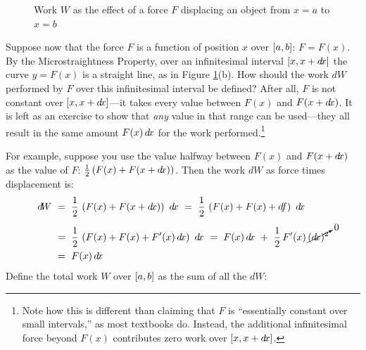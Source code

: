 \begin{figure}[ht]
 \centering
 \qquad\qquad
 \caption[]{\enskip Work $W$ as the effect of a force $F$ displacing an object from $x=a$ to $x=b$}
 \label{fig:work}
\end{figure}

Suppose now that the force $F$ is a function of position $x$ over $\lbrack a,b \rbrack$:
$F=F(x)$. By the Microstraightness Property, over an infinitesimal interval
$\lbrack x,x+d\!x \rbrack$ the curve $y=F(x)$ is a straight line, as in Figure
\ref{fig:work}(b). How should the work $d\!W$ performed by $F$ over this
infinitesimal interval be defined? After all, $F$ is not constant over
$\lbrack x,x+d\!x \rbrack$---it takes every value between $F(x)$ and $F(x+d\!x)$. It is
left as an exercise to show that \emph{any} value in that range can be
used---they all result in the same amount $F(x)\,d\!x$ for the work
performed.\footnote{Note how this is different than claiming that $F$ is
``essentially constant over small intervals,'' as most textbooks do. Instead,
the additional infinitesimal force beyond $F(x)$ contributes zero work over
$\lbrack x,x+d\!x \rbrack$.}

For example, suppose you use the value halfway between $F(x)$ and $F(x+d\!x)$ as
the value of $F$: $\frac{1}{2}\,(F(x)+F(x+d\!x))$. Then the work $d\!W$ as force
times displacement is:
\begin{align*}
d\!W ~&=~ \frac{1}{2}\,\left(F(x) + F(x+\dx)\right)~\dx ~=~
\frac{1}{2}\,\left(F(x) + F(x)+ \df\right)~\dx\\[4pt]
&=~ \frac{1}{2}\,\left(F(x) + F(x)+ F'(x)\,\dx\right)~\dx ~=~ F(x)\,\dx ~+~ \frac{1}{2}\,F'(x)\,\cancelto{0}{(\dx)^2}\\
&=~ F(x)\,\dx
\end{align*}
Define the total work $W$ over $\lbrack a,b \rbrack$ as the sum of all the $d\!W$:

